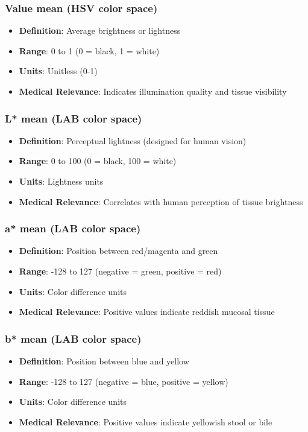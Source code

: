 \documentclass[11pt]{article}
\begin{document}
\subsubsection{Value mean (HSV color space)}
\begin{itemize}
    \item \textbf{Definition}: Average brightness or lightness
    \item \textbf{Range}: 0 to 1 (0 = black, 1 = white)
    \item \textbf{Units}: Unitless (0-1)
    \item \textbf{Medical Relevance}: Indicates illumination quality and tissue visibility
\end{itemize}

\subsubsection{L* mean (LAB color space)}
\begin{itemize}
    \item \textbf{Definition}: Perceptual lightness (designed for human vision)
    \item \textbf{Range}: 0 to 100 (0 = black, 100 = white)
    \item \textbf{Units}: Lightness units
    \item \textbf{Medical Relevance}: Correlates with human perception of tissue brightness
\end{itemize}

\subsubsection{a* mean (LAB color space)}
\begin{itemize}
    \item \textbf{Definition}: Position between red/magenta and green
    \item \textbf{Range}: -128 to 127 (negative = green, positive = red)
    \item \textbf{Units}: Color difference units
    \item \textbf{Medical Relevance}: Positive values indicate reddish mucosal tissue
\end{itemize}

\subsubsection{b* mean (LAB color space)}
\begin{itemize}
    \item \textbf{Definition}: Position between blue and yellow
    \item \textbf{Range}: -128 to 127 (negative = blue, positive = yellow)
    \item \textbf{Units}: Color difference units
    \item \textbf{Medical Relevance}: Positive values indicate yellowish stool or bile
\end{itemize}
\end{document}
